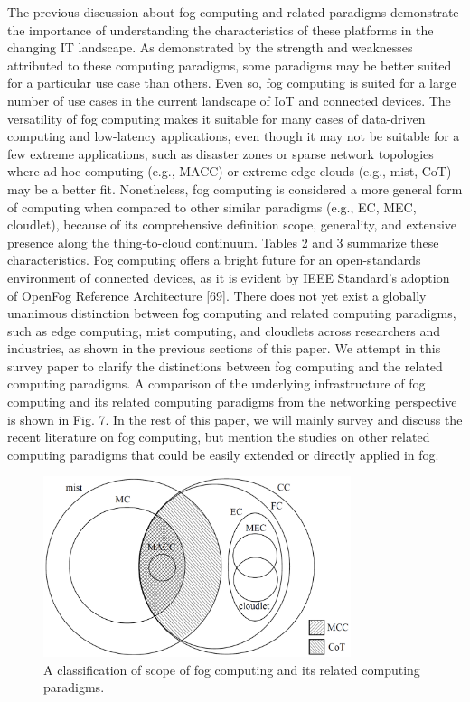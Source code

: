 The previous discussion about fog computing and related paradigms demonstrate the importance of understanding the characteristics of these platforms in the changing IT landscape. As demonstrated by the strength and weaknesses attributed to these computing paradigms, some paradigms may be better suited for a particular
use case than others. Even so, fog computing is suited for a large number of use cases in the current landscape of IoT and connected devices. The versatility of fog computing makes it suitable for many cases of data-driven computing and low-latency applications, even though it may not be suitable for a few extreme applications, such as disaster zones or sparse network topologies where ad hoc computing (e.g., MACC) or extreme edge clouds (e.g., mist, CoT) may be a better fit. Nonetheless, fog computing is considered a more general form of computing when compared to other similar paradigms (e.g., EC, MEC, cloudlet), because of its comprehensive definition scope, generality, and extensive presence along the thing-to-cloud continuum. Tables 2 and 3 summarize these characteristics. Fog computing offers a bright future for an open-standards environment of connected devices, as it is evident by IEEE Standard’s adoption of OpenFog Reference Architecture [69]. There does not yet exist a globally unanimous distinction between fog computing and related computing paradigms, such as edge computing, mist computing, and cloudlets across researchers and industries, as shown in the previous sections of this paper. We attempt in this survey paper to clarify the distinctions between fog computing and the related computing paradigms. A comparison of the underlying infrastructure of fog computing and its related computing paradigms from the networking perspective is shown in Fig. 7. In the rest of this paper, we will mainly survey and discuss the recent literature on fog computing, but mention the studies on other related computing paradigms that could be easily extended or directly applied in fog.

\begin{figure}
	\centering
	\includegraphics[width=90mm]{images/computing_paradigms}
	\caption{A classification of scope of fog computing and its related computing paradigms.}
	\label{computing_paradigms}
\end{figure}

